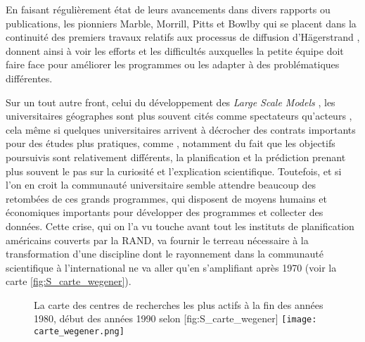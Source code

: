En faisant régulièrement état de leurs avancements dans divers rapports ou publications, les pionniers Marble, Morrill, Pitts et Bowlby \autocite{Pitts1963} qui se placent dans la continuité des premiers travaux relatifs aux processus de diffusion d'Hägerstrand \autocite{Hagerstrand1953, Hagerstrand1967a}, donnent ainsi à voir les efforts et les difficultés auxquelles la petite équipe doit faire face pour améliorer les programmes ou les adapter à des problématiques différentes.

Sur un tout autre front, celui du développement des \textit{Large Scale Models} \autocites[8]{Batty1976}, les universitaires géographes sont plus souvent cités comme spectateurs qu'acteurs \autocites[9]{Batty1994}[153]{Batty1989}, cela même si quelques universitaires arrivent à décrocher des contrats importants \autocite{Barnes2006a} pour des études plus pratiques, comme \textcite{Garrison1959}, notamment du fait que les objectifs poursuivis sont relativement différents, la planification et la prédiction prenant plus souvent le pas sur la curiosité et l'explication scientifique. Toutefois, et si l'on en croit \textcite{Haggett1969} la communauté universitaire semble attendre beaucoup des retombées de ces grands programmes, qui disposent de moyens humains et économiques importants pour développer des programmes et collecter des données. Cette crise, qui on l'a vu touche avant tout les instituts de planification américains couverts par la RAND, va fournir le terreau nécessaire à la transformation d'une discipline dont le rayonnement dans la communauté scientifique à l'international ne va aller qu'en s'amplifiant après 1970 (voir la carte \ref{fig:S_carte_wegener}).

\begin{figure}[htbp]
\begin{sidecaption}{La carte des centres de recherches les plus actifs à la fin des années 1980, début des années 1990 selon \textcite{Wegener1994}}[fig:S_carte_wegener]
  \centering
 \texttt{[image: carte\_wegener.png]}
  \end{sidecaption}
\end{figure}

